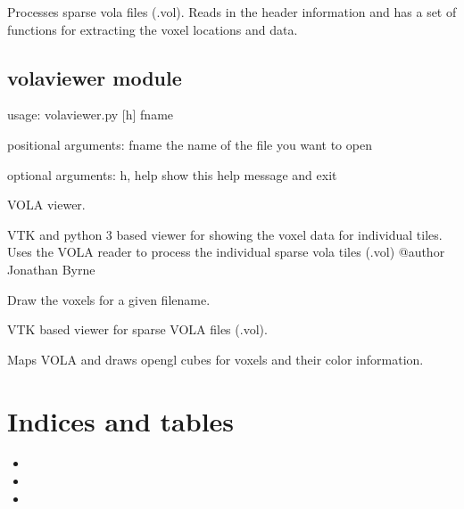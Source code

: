 \documentclass[letterpaper,10pt,english]{sphinxmanual}
\begin{document}
Processes sparse vola files (.vol). Reads in the header information and
has a set of functions for extracting the voxel locations and data.


\section{volaviewer module}
\label{\detokenize{volaviewer::doc}}\label{\detokenize{volaviewer:volaviewer-module}}
\begin{sphinxVerbatim}[commandchars=\\\{\}]
usage: volaviewer.py [\PYGZhy{}h] fname

positional arguments:
  fname       the name of the file you want to open

optional arguments:
  \PYGZhy{}h, \PYGZhy{}\PYGZhy{}help  show this help message and exit
\end{sphinxVerbatim}
\label{\detokenize{volaviewer:module-volaviewer}}
VOLA viewer.

VTK and python 3 based viewer for showing the voxel data for individual tiles.
Uses the VOLA reader to process the individual sparse vola tiles (.vol)
@author Jonathan Byrne

\begin{fulllineitems}
\label{\detokenize{volaviewer:volaviewer.main}}
Draw the voxels for a given filename.

\end{fulllineitems}


\begin{fulllineitems}
\label{\detokenize{volaviewer:volaviewer.view_voxels}}
VTK based viewer for sparse VOLA files (.vol).

Maps VOLA and draws opengl cubes for voxels and their color information.

\end{fulllineitems}



\chapter{Indices and tables}
\label{\detokenize{index:indices-and-tables}}\begin{itemize}
\item {} 

\item {} 

\item {} 

\end{itemize}
\end{document}
